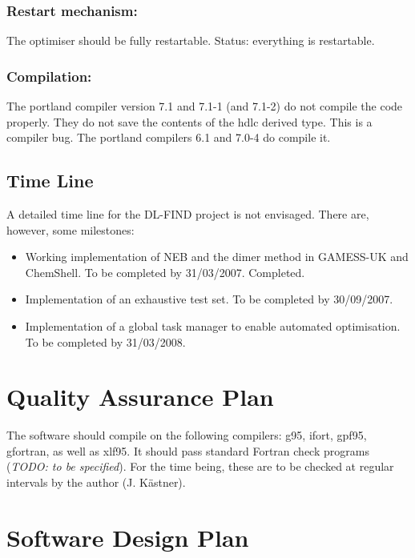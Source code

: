 \documentclass{article}
\begin{document}
\subsubsection{Restart mechanism:}

The optimiser should be fully restartable. Status: everything is restartable.

\subsubsection{Compilation:} The portland compiler version 7.1 and 7.1-1 (and
7.1-2) do not compile the code properly. They do not save the contents of the
hdlc derived type. This is a compiler bug. The portland compilers 6.1 and
7.0-4 do compile it.

\subsection{Time Line}

A detailed time line for the DL-FIND project is not envisaged. There are,
however, some milestones:
\begin{itemize}
\item Working implementation of NEB and the dimer method in GAMESS-UK and
  ChemShell. To be completed by 31/03/2007. Completed.
\item Implementation of an exhaustive test set. To be completed by 30/09/2007.
\item Implementation of a global task manager to enable automated
  optimisation. To be completed by 31/03/2008.
\end{itemize}

\section{Quality Assurance Plan}

The software should compile on the following compilers: g95, ifort, gpf95,
gfortran, as well as xlf95. It should pass standard Fortran check programs
(\emph{TODO: to be specified}). For the time being, these are to be checked at
regular intervals by the author (J. K\"astner).

\section{Software Design Plan}
\end{document}
